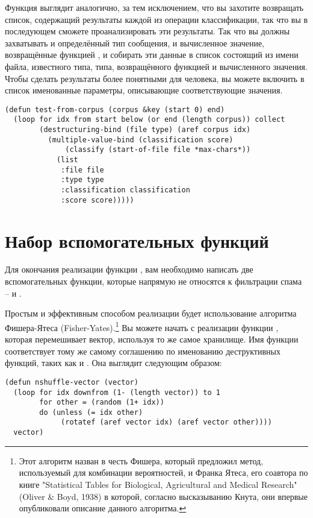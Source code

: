 Функция  выглядит аналогично, за тем исключением, что вы захотите
возвращать список, содержащий результаты каждой из операции классификации, так что вы в
последующем сможете проанализировать эти результаты.  Так что вы должны захватывать и
определённый тип сообщения, и вычисленное значение, возвращённые функцией ,
и собирать эти данные в список состоящий из имени файла, известного типа, типа,
возвращённого функцией  и вычисленного значения.  Чтобы сделать результаты
более понятными для человека, вы можете включить в список именованные параметры,
описывающие соответствующие значения.

\begin{lstlisting}
(defun test-from-corpus (corpus &key (start 0) end)
  (loop for idx from start below (or end (length corpus)) collect
        (destructuring-bind (file type) (aref corpus idx)
          (multiple-value-bind (classification score)
              (classify (start-of-file file *max-chars*))
            (list 
             :file file
             :type type
             :classification classification
             :score score)))))
\end{lstlisting}


\section{Набор вспомогательных функций}

Для окончания реализации функции , вам необходимо написать две
вспомогательных функции, которые напрямую не относятся к фильтрации спама --
 и .

Простым и эффективным способом реализации  будет использование
алгоритма Фишера-Ятеса (Fisher-Yates).\footnote{Этот алгоритм назван в честь Фишера,
  который предложил метод, используемый для комбинации вероятностей, и Франка Ятеса, его
  соавтора по книге "Statistical Tables for Biological, Agricultural and Medical Research"
  (Oliver \& Boyd, 1938) в которой, согласно высказыванию Кнута, они впервые опубликовали
  описание данного алгоритма.}  Вы можете начать с реализации функции
, которая перемешивает вектор, используя то же самое хранилище.  Имя
функции соответствует тому же самому соглашению по именованию деструктивных функций, таких
как  и .  Она выглядит следующим образом:

\begin{lstlisting}
(defun nshuffle-vector (vector)
  (loop for idx downfrom (1- (length vector)) to 1
        for other = (random (1+ idx))
        do (unless (= idx other)
             (rotatef (aref vector idx) (aref vector other))))
  vector)
\end{lstlisting}

